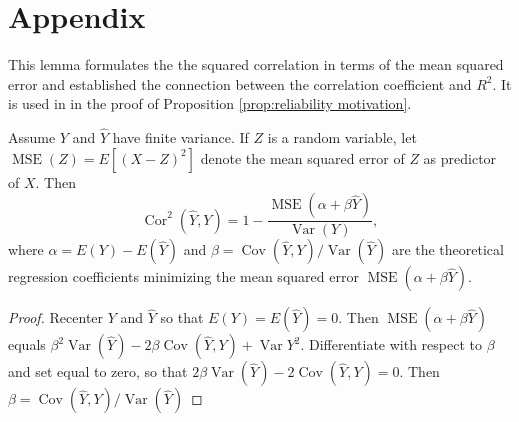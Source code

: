\documentclass[twoside]{article}
\DeclareMathOperator{\Var}{Var}
\DeclareMathOperator{\Cor}{Cor}
\DeclareMathOperator{\Cov}{Cov}
\DeclareMathOperator{\MSE}{MSE}
\begin{document}
\section*{Appendix}

This lemma formulates the the squared correlation in terms of the mean squared error and established the connection between the correlation coefficient and $R^2$. It is used in in the proof of Proposition \ref{prop:reliability motivation}. 
\begin{lem}
\label{lem:r^2 and correlation}Assume $Y$ and $\hat{Y}$ have finite
variance. If $Z$ is a random variable, let $\MSE(Z) = E[(X-Z)^2]$ denote the mean squared error of $Z$ as predictor of $X$. Then 
\begin{equation}
\Cor^{2}(\hat{Y},Y)=1-\frac{\MSE(\alpha+\beta\hat{Y})}{\Var(Y)},\label{eq:rsq and correlation}
\end{equation}
where $\alpha=E(Y)-E(\hat{Y})$ and $\beta=\Cov(\hat{Y},Y)/\Var(\hat{Y})$ are the theoretical regression coefficients minimizing the mean squared error $\MSE(\alpha+\beta\hat{Y})$. 
\end{lem}

\begin{proof}
Recenter $Y$ and $\hat{Y}$ so that $E(Y)=E(\hat{Y})=0$. Then $\MSE(\alpha+\beta\hat{Y})$ equals $\beta^{2}\Var(\hat{Y})-2\beta\Cov(\hat{Y},Y)+\Var Y^{2}$.
Differentiate with respect to $\beta$ and set equal to zero, so that
$2\beta\Var(\hat{Y})-2\Cov(\hat{Y},Y)=0$. Then $\beta=\Cov(\hat{Y},Y)/\Var(\hat{Y})$
\end{proof}
\end{document}

